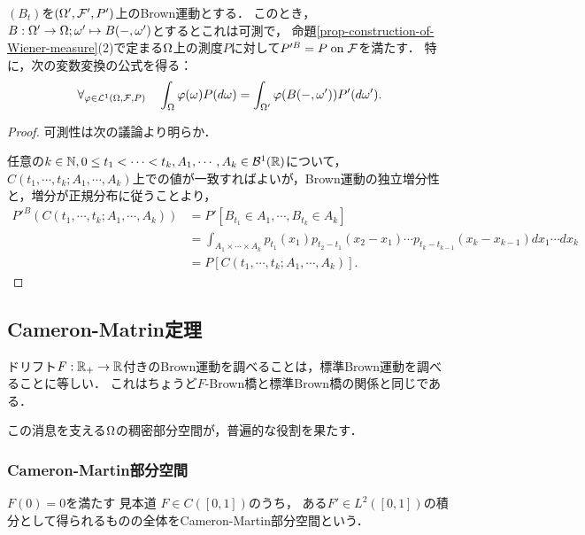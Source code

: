 \documentclass[uplatex,dvipdfmx]{jsreport}
\begin{document}
\begin{lemma}[Wiener測度の特徴付け]
    $(B_t)$を$(\Omega',\mathcal{F}',P')$上のBrown運動とする．
    このとき，$B:\Omega'\to\Omega;\omega'\mapsto B(-,\omega')$とするとこれは可測で，
    命題\ref{prop-construction-of-Wiener-measure}(2)で定まる$\Omega$上の測度$P$に対して$P'^B=P\;\mathrm{on}\;\mathcal{F}$を満たす．
    特に，次の変数変換の公式を得る：
    \[\forall_{\varphi\in\mathcal{L}^1(\Omega,\mathcal{F},P)}\quad\int_\Omega\varphi(\omega)P(d\omega)=\int_{\Omega'}\varphi(B(-,\omega'))P'(d\omega').\]
\end{lemma}
\begin{proof}
    可測性は次の議論より明らか．

    任意の$k\in\mathbb{N},0\le t_1<\cdots<t_k,A_1,\cdots,A_k\in\mathcal{B}^1(\mathbb{R})$について，$C(t_1,\cdots,t_k;A_1,\cdots,A_k)$上での値が一致すればよいが，Brown運動の独立増分性と，増分が正規分布に従うことより，
    \begin{align*}
        P'^B(C(t_1,\cdots,t_k;A_1,\cdots,A_k))&=P'[B_{t_1}\in A_1,\cdots,B_{t_k}\in A_k]\\
        &=\int_{A_1\times\cdots\times A_k}p_{t_1}(x_1)p_{t_2-t_1}(x_2-x_1)\cdots p_{t_k-t_{k-1}}(x_k-x_{k-1})dx_1\cdots dx_k\\
        &=P[C(t_1,\cdots,t_k;A_1,\cdots,A_k)].
    \end{align*}
\end{proof}

\subsection{Cameron-Matrin定理}

\begin{tcolorbox}[colframe=ForestGreen, colback=ForestGreen!10!white,breakable,colbacktitle=ForestGreen!40!white,coltitle=black,fonttitle=\bfseries\sffamily,
title=]
    ドリフト$F:\mathbb{R}_+\to\mathbb{R}$付きのBrown運動を調べることは，標準Brown運動を調べることに等しい．
    これはちょうど$F$-Brown橋と標準Brown橋の関係と同じである．

    この消息を支える$\Omega$の稠密部分空間が，普遍的な役割を果たす．
\end{tcolorbox}

\subsubsection{Cameron-Martin部分空間}

\begin{tcolorbox}[colframe=ForestGreen, colback=ForestGreen!10!white,breakable,colbacktitle=ForestGreen!40!white,coltitle=black,fonttitle=\bfseries\sffamily,
title=]
    $F(0)=0$を満たす
    見本道
    $F\in C([0,1])$のうち，
    ある$F'\in L^2([0,1])$の積分として得られるものの全体をCameron-Martin部分空間という．
\end{tcolorbox}
\end{document}
